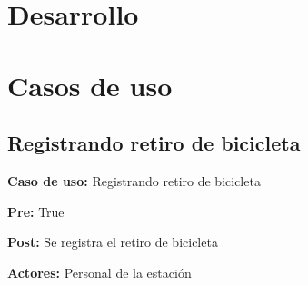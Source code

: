 \documentclass[a4paper, 10pt, twoside]{article}
\begin{document}
\begin{usecase}
\end{usecase}
\begin{usecasesteps}
         { \\
           \\
          }
         {}
\end{usecasesteps}


\vspace{2cm}






\section{Desarrollo}




\section{Casos de uso}

\subsection{Registrando retiro de bicicleta}

\textbf{Caso de uso:} Registrando retiro de bicicleta

\textbf{Pre:} True

\textbf{Post:} Se registra el retiro de bicicleta

\textbf{Actores:} Personal de la estación
\\
\end{document}
